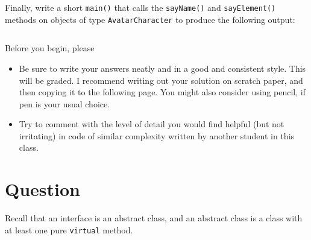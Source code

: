 Finally, write a short \texttt{main()} that calls the
\texttt{sayName()} and \texttt{sayElement()} methods on
objects of type \texttt{AvatarCharacter} to produce the following
output:
\inputminted[label=Output]{text}{\docCodeDir/.classes.gen.output}

Before you begin, please
\begin{itemize}
  \item Be sure to write your answers neatly and in a good and consistent
    style.  This will be graded.  I recommend writing out your solution on
    scratch paper, and then copying it to the following page.  You might also
    consider using pencil, if pen is your usual choice.
  \item Try to comment with the level of detail you would find helpful (but not
    irritating) in code of similar complexity written by another student in
    this class.
\end{itemize}

\newpage

\textQuestion{\makePageQuadrilleRuled}

\newOddPage

\textQuestion{\makePageQuadrilleRuled}
\textAnswer{~}


\newEvenPage

\section{Question}

Recall that an interface is an abstract class, and an abstract class is a class
with at least one pure \texttt{virtual} method.

